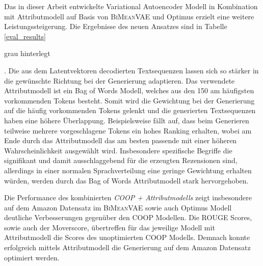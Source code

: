 \newlength{\HeightReference}
\setlength{\HeightReference}{7pt}


\newlength{\Width}%

\newcommand{\ccolorbox}[2][red]%
{%
    \settowidth{\Width}{#2}%
    \setlength{\fboxsep}{1pt}%
    \colorbox{#1}%
    {%
        \raisebox{-\DepthReference}%
        {%
                \parbox[b][\HeightReference+\DepthReference][c]{\Width}{\centering#2}%
        }%
    }%
}



\normalsize




Das in dieser Arbeit entwickelte Variational Autoencoder Modell in Kombination mit Attributmodell auf Basis von \textsc{BiMeanVAE} und Optimus erzielt eine weitere Leistungssteigerung.
Die Ergebnisse des neuen Ansatzes sind in Tabelle \ref{eval_results} \ccolorbox[ColorGray]{grau hinterlegt}.
Die aus dem Latentvektoren decodierten Textsequenzen lassen sich so stärker in die gewünschte Richtung bei der Generierung adaptieren. 
Das verwendete Attributmodell ist ein Bag of Words Modell, welches aus den 150 am häufigsten vorkommenden Tokens besteht. 
Somit wird die Gewichtung bei der Generierung auf die häufig vorkommenden Tokens gelenkt und die generierten Textsequenzen haben eine höhere Überlappung.
Beispielsweise fällt auf, dass beim Generieren teilweise mehrere vorgeschlagene Tokens ein hohes Ranking erhalten, wobei am Ende durch das Attributmodell das am besten passende mit einer höheren Wahrscheinlichkeit ausgewählt wird.
Insbesondere spezifische Begriffe die signifikant und damit ausschlaggebend für die erzeugten Rezensionen sind, allerdings in einer normalen Sprachverteilung eine geringe Gewichtung erhalten würden, werden durch das Bag of Words Attributmodell stark hervorgehoben.

Die Performance des kombinierten \textit{COOP + Attributmodells} zeigt insbesondere auf dem Amazon Datensatz im \textsc{BiMeanVAE} sowie auch Optimus Modell deutliche Verbesser\-ungen gegenüber den COOP Modellen.
Die ROUGE Scores, sowie auch der Moverscore, übertreffen für das jeweilige Modell mit Attributmodell die Scores des unoptimierten COOP Modells. 
Demnach konnte erfolgreich mittels Attributmodell die Generierung auf dem Amazon Datensatz optimiert werden.

